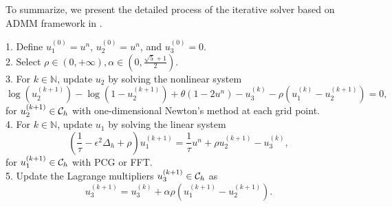 \par To summarize, we present the detailed process of the iterative solver based on ADMM framework in .
\begin{algorithm}[!t]
    \caption{Iterative solver based on ADMM framework}
\label{alg:ADMM}
    \raggedright
    1. Define $u_1^{(0)}=u^n$, $u_2^{(0)}=u^n$, and
    $u_3^{(0)}=0$.\\
    2. Select $\rho\in(0,+\infty), \alpha \in (0,\frac{\sqrt{5}+1}{2})$.\\
    3. For $k\in\mathbb{N}$, update $u_2$ by solving the nonlinear system
    \begin{equation}
    \log(u_2^{(k+1)})-\log(1-u_2^{(k+1)})+
    \theta(1-2u^n)-u_3^{(k)}-\rho(u_1^{(k)}-u_2^{(k+1)})=0,
    \end{equation}
    \hspace{10pt} for $u_2^{(k+1)}\in{\mathcal{C}_h}$ with one-dimensional Newton's method at each grid point.\\
    4. For $k\in\mathbb{N}$, update $u_1$ by solving the linear system
    \begin{equation}
    \label{u1}
        (\frac{1}{\tau}-\epsilon^2\Delta_h+\rho)u_1^{(k+1)}=\frac{1}{\tau}u^n+\rho u_2^{(k+1)}-u_3^{(k)},
    \end{equation}
    \hspace{10pt} for $u_1^{(k+1)}\in{\mathcal{C}_h}$ with PCG or FFT.\\ 
    5. Update the Lagrange multipliers $u_3^{(k+1)}\in{\mathcal{C}_h}$ as
    \begin{equation}\label{eq:u3}
    u_3^{(k+1)}=u_3^{(k)}+\alpha \rho(u_1^{(k+1)}-u_2^{(k+1)}).
    \end{equation}
\end{algorithm}


\iffalse

